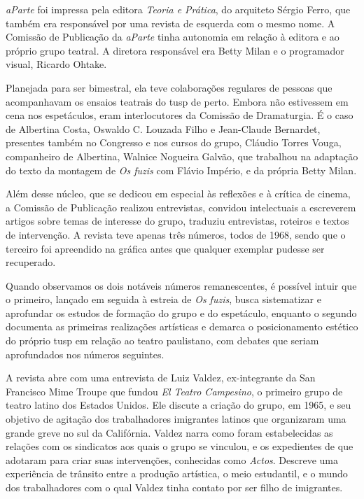 {\it aParte} foi impressa pela editora {\it Teoria e Prática}, do
arquiteto Sérgio Ferro, que também era responsável por uma revista de
esquerda com o mesmo nome. A Comissão de Publicação da {\it aParte}
tinha autonomia em relação à editora e ao próprio grupo teatral. A
diretora responsável era Betty Milan e o programador visual, Ricardo
Ohtake.

Planejada para ser bimestral, ela teve colaborações regulares de pessoas
que acompanhavam os ensaios teatrais do {\sc tusp} de perto. Embora não
estivessem em cena nos espetáculos, eram interlocutores da Comissão de
Dramaturgia. É o caso de Albertina Costa, Oswaldo C. Louzada Filho e
Jean-Claude Bernardet, presentes também no Congresso e nos cursos do
grupo, Cláudio Torres Vouga, companheiro de Albertina, Walnice Nogueira
Galvão, que trabalhou na adaptação do texto da montagem de {\it Os
fuzis} com Flávio Império, e da própria Betty Milan.

Além desse núcleo, que se dedicou em especial às reflexões e à crítica
de cinema, a Comissão de Publicação realizou entrevistas, convidou
intelectuais a escreverem artigos sobre temas de interesse do grupo,
traduziu entrevistas, roteiros e textos de intervenção. A revista teve
apenas três números, todos de 1968, sendo que o terceiro foi apreendido
na gráfica antes que qualquer exemplar pudesse ser recuperado.


Quando observamos os dois notáveis números remanescentes, é possível
intuir que o primeiro, lançado em seguida à estreia de {\it Os fuzis},
busca sistematizar e aprofundar os estudos de formação do grupo e do
espetáculo, enquanto o segundo documenta as primeiras realizações
artísticas e demarca o posicionamento estético do próprio {\sc tusp} em
relação ao teatro paulistano, com debates que seriam aprofundados nos
números seguintes.

A revista abre com uma entrevista de Luiz Valdez, ex-integrante da San
Francisco Mime Troupe que fundou {\it El Teatro Campesino}, o primeiro
grupo de teatro latino dos Estados Unidos. Ele discute a criação do
grupo, em 1965, e seu objetivo de agitação dos trabalhadores imigrantes
latinos que organizaram uma grande greve no sul da Califórnia. Valdez
narra como foram estabelecidas as relações com os sindicatos aos quais o
grupo se vinculou, e os expedientes de que adotaram para criar suas
intervenções, conhecidas como {\it Actos}. Descreve uma experiência de
trânsito entre a produção artística, o meio estudantil, e o mundo dos
trabalhadores com o qual Valdez tinha contato por ser filho de
imigrantes.

